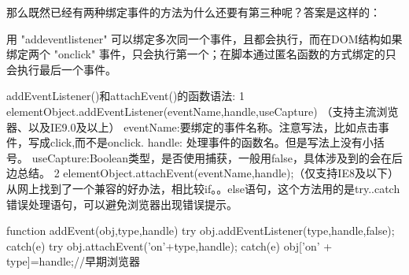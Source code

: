 那么既然已经有两种绑定事件的方法为什么还要有第三种呢？答案是这样的：

用 "addeventlistener" 可以绑定多次同一个事件，且都会执行，而在DOM结构如果绑定两个 "onclick" 事件，只会执行第一个；在脚本通过匿名函数的方式绑定的只会执行最后一个事件。

addEventListener()和attachEvent()的函数语法:
1 elementObject.addEventListener(eventName,handle,useCapture) （支持主流浏览器、以及IE9.0及以上）
eventName:要绑定的事件名称。注意写法，比如点击事件，写成click,而不是onclick.
handle: 处理事件的函数名。但是写法上没有小括号。
useCapture:Boolean类型，是否使用捕获，一般用false，具体涉及到的会在后边总结。
2 elementObject.attachEvent(eventName,handle);（仅支持IE8及以下）
从网上找到了一个兼容的好办法，相比较if。。else语句，这个方法用的是try..catch错误处理语句，可以避免浏览器出现错误提示。

function addEvent(obj,type,handle){
  try{
   obj.addEventListener(type,handle,false);
  }catch(e){
   try{
    obj.attachEvent('on'+type,handle);
   }
   catch(e){
    obj['on' + type]=handle;//早期浏览器
   }
  }
}